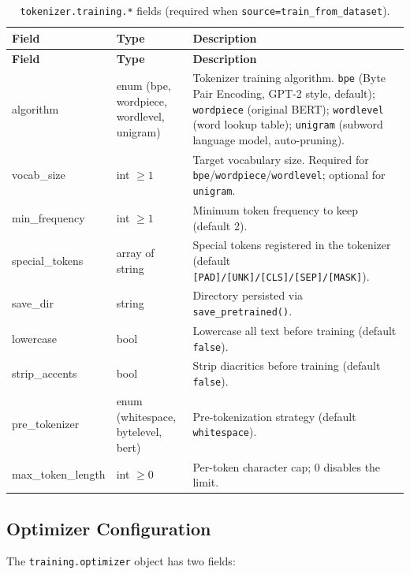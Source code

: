 \begin{longtable}{>{\ttfamily\footnotesize\raggedright\arraybackslash}p{5.6cm}>{\raggedright\arraybackslash}p{2.4cm}>{\raggedright\arraybackslash}p{6.9cm}}
\toprule
\textbf{Field} & \textbf{Type} & \textbf{Description} \\
\midrule
\endfirsthead
\toprule
\textbf{Field} & \textbf{Type} & \textbf{Description} \\
\midrule
\endhead
\bottomrule
\caption{\texttt{tokenizer.training.*} fields (required when \texttt{source=train\_from\_dataset}).}
\label{tab:tokenizer-training}
\endlastfoot
algorithm & enum (bpe, wordpiece, wordlevel, unigram) & Tokenizer training algorithm. \texttt{bpe} (Byte Pair Encoding, GPT-2 style, default); \texttt{wordpiece} (original BERT); \texttt{wordlevel} (word lookup table); \texttt{unigram} (subword language model, auto-pruning). \\
vocab\_size & int $\ge 1$ & Target vocabulary size. Required for \texttt{bpe}/\texttt{wordpiece}/\texttt{wordlevel}; optional for \texttt{unigram}. \\
min\_frequency & int $\ge 1$ & Minimum token frequency to keep (default 2). \\
special\_tokens & array of string & Special tokens registered in the tokenizer (default \texttt{[PAD]/[UNK]/[CLS]/[SEP]/[MASK]}). \\[\smallskipamount]
save\_dir & string & Directory persisted via \texttt{save\_pretrained()}. \\
lowercase & bool & Lowercase all text before training (default \texttt{false}). \\
strip\_accents & bool & Strip diacritics before training (default \texttt{false}). \\
pre\_tokenizer & enum (whitespace, bytelevel, bert) & Pre-tokenization strategy (default \texttt{whitespace}). \\
max\_token\_length & int $\ge 0$ & Per-token character cap; 0 disables the limit. \\
\end{longtable}

\subsection{Optimizer Configuration}
\label{subsec:optimizer-config}

The \texttt{training.optimizer} object has two fields:

